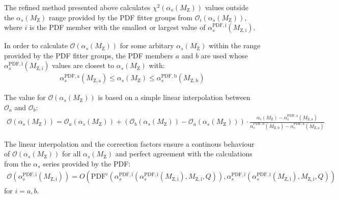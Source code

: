 \documentclass{PoS}
\begin{document}
The refined method presented above calculates $\chi^2(\alpha_s(M_\mathrm{Z}))$ values outside the
$\alpha_s(M_\mathrm{Z})$ range provided by the PDF fitter groups from
$\mathcal{O}_i(\alpha_s(M_\mathrm{Z}))$, where $i$ is the PDF member with the smallest or largest value of
$\alpha_s^\mathrm{PDF,i}(M_\mathrm{Z,i})$.

In order to calculate $\mathcal{O}(\alpha_s(M_\mathrm{Z}))$ for some arbitary $\alpha_s(M_\mathrm{Z})$ within the
range provided by the PDF fitter groups, the PDF members $a$ and $b$ are used
whose $\alpha_s^\mathrm{PDF,i}(M_\mathrm{Z,i})$ values are closest to $\alpha_s(M_\mathrm{Z})$ with:
\begin{eqnarray}
\alpha_s^\mathrm{PDF,a}(M_\mathrm{Z,a}) \leq \alpha_s(M_\mathrm{Z}) \leq \alpha_s^\mathrm{PDF,b}(M_\mathrm{Z,b})
\end{eqnarray}

The value for $\mathcal{O}(\alpha_s(M_\mathrm{Z}))$ is based on a simple linear interpolation between $\mathcal{O}_a$ and $\mathcal{O}_b$:
\begin{eqnarray}
\mathcal{O}(\alpha_s(M_\mathrm{Z})) =
\mathcal{O}_a(\alpha_s(M_\mathrm{Z})) +
\left( \mathcal{O}_b(\alpha_s(M_\mathrm{Z})) - \mathcal{O}_a(\alpha_s(M_\mathrm{Z})) \right) \cdot
	\frac{
		\alpha_s(M_\mathrm{Z}) - \alpha_s^\mathrm{PDF,a}(M_\mathrm{Z,a})
	}{
		\alpha_s^\mathrm{PDF,b}(M_\mathrm{Z,b}) - \alpha_s^\mathrm{PDF,a}(M_\mathrm{Z,a})
	}
\end{eqnarray}

The linear interpolation and the correction factors ensure a continous behaviour
of $\mathcal{O}(\alpha_s(M_\mathrm{Z}))$ for all $\alpha_s(M_\mathrm{Z})$ and
perfect agreement with the calculations from the $\alpha_s$ series provided by the PDF:
\begin{eqnarray}
\mathcal{O}(\alpha_s^\mathrm{PDF,i}(M_\mathrm{Z,i})) = O(\mathrm{PDF}^i(
		\alpha_s^\mathrm{PDF,i}(\alpha_s^\mathrm{PDF,i}(M_\mathrm{Z,i}), M_\mathrm{Z,i}, Q)),
		\alpha_s^\mathrm{PDF,i}(\alpha_s^\mathrm{PDF,i}(M_\mathrm{Z,i}), M_\mathrm{Z,i}, Q))
\end{eqnarray}
for $i = a,b$.

\newpage


\end{document}
